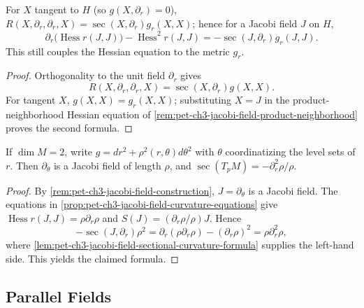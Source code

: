 \begin{lemma}
  \label{lem:pet-ch3-jacobi-field-sectional-curvature-formula}
  \leanok
  For $X$ tangent to $H$ (so $g(X,\partial_r)=0$),
  $R(X,\partial_r,\partial_r,X)=\sec(X,\partial_r)g_r(X,X)$; hence for a Jacobi
  field $J$ on $H$,
  \[
    \partial_r\big(\operatorname{Hess}r(J,J)\big)-\operatorname{Hess}^2r(J,J)=-\sec(J,\partial_r)g_r(J,J).
  \]
  This still couples the Hessian equation to the metric $g_r$.
\end{lemma}
\begin{proof}
  \leanok
  \sketch
  Orthogonality to the unit field $\partial_r$ gives
  \[
   R(X,\partial_r,\partial_r,X)
   =\sec(X,\partial_r)g(X,X).
  \]
  For tangent $X$, $g(X,X)=g_r(X,X)$; substituting $X=J$ in the
  product-neighborhood Hessian equation of
  \cref{rem:pet-ch3-jacobi-field-product-neighborhood} proves the second formula.
\end{proof}

\begin{example}
  \label{ex:pet-ch3-two-dim-sectional-curvature-formula}
  \leanok
  If $\dim M=2$, write $g=dr^2+\rho^2(r,\theta)d\theta^2$ with $\theta$
  coordinatizing the level sets of $r$. Then $\partial_\theta$ is a Jacobi field
  of length $\rho$, and $\sec(T_pM)=-\partial_r^2\rho/\rho$.
\end{example}
\begin{proof}
  \leanok
  \sketch
  By \cref{rem:pet-ch3-jacobi-field-construction},
  $J=\partial_\theta$ is a Jacobi field. The equations in
  \cref{prop:pet-ch3-jacobi-field-curvature-equations} give
  $\operatorname{Hess}r(J,J)=\rho\partial_r\rho$ and
  $S(J)=(\partial_r\rho/\rho)J$. Hence
  \[
   -\sec(J,\partial_r)\rho^2
   =\partial_r(\rho\partial_r\rho)-(\partial_r\rho)^2
   =\rho\partial_r^2\rho,
  \]
  where \cref{lem:pet-ch3-jacobi-field-sectional-curvature-formula} supplies the
  left-hand side. This yields the claimed formula.
\end{proof}

\subsection{Parallel Fields}

